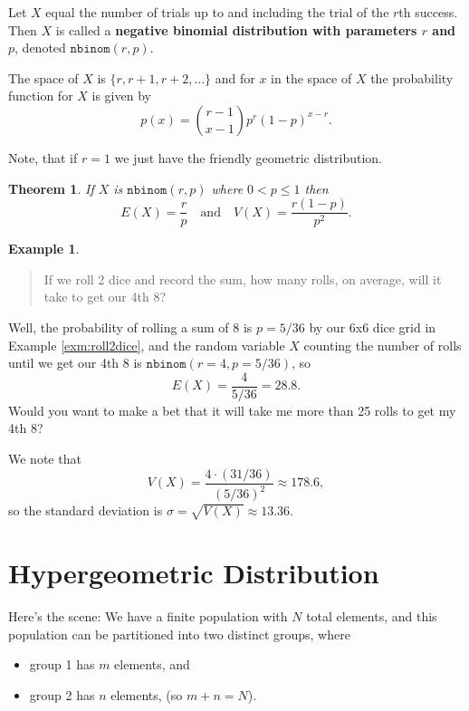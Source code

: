 \documentclass[
]{book}
\providecommand{\tightlist}{%
  \setlength{\itemsep}{0pt}\setlength{\parskip}{0pt}}
\newtheorem{theorem}{Theorem}[chapter]
\theoremstyle{definition}
\theoremstyle{definition}
\newtheorem{example}{Example}[chapter]
\theoremstyle{definition}
\theoremstyle{definition}
\theoremstyle{remark}
\begin{document}
Let \(X\) equal the number of trials up to and including the trial of the \(r\)th success. Then \(X\) is called a \textbf{negative binomial distribution with parameters \(r\) and \(p\)}, denoted \(\texttt{nbinom}(r,p)\).

The space of \(X\) is \(\{r, r+1, r+2, \ldots\}\) and for \(x\) in the space of \(X\) the probability function for \(X\) is given by \[p(x) = \binom{r-1}{x-1}p^r(1-p)^{x-r}.\]

Note, that if \(r=1\) we just have the friendly geometric distribution.

\begin{theorem}
\protect\hypertarget{thm:negative-binomial-EandV}{}\label{thm:negative-binomial-EandV}If \(X\) is \(\texttt{nbinom}(r,p)\) where \(0 < p \leq 1\) then
\[E(X) = \frac{r}{p} ~~~ \text{ and } ~~~ V(X) = \frac{r(1-p)}{p^2}.\]
\end{theorem}

\begin{example}
\leavevmode

\begin{quote}
If we roll 2 dice and record the sum, how many rolls, on average, will it take to get our 4th 8?
\end{quote}

Well, the probability of rolling a sum of 8 is \(p = 5/36\) by our 6x6 dice grid in Example \ref{exm:roll2dice}, and the random variable \(X\) counting the number of rolls until we get our 4th 8 is \(\texttt{nbinom}(r=4,p=5/36)\), so \[E(X) = \frac{4}{5/36} = 28.8.\] Would you want to make a bet that it will take me more than 25 rolls to get my 4th 8?

We note that \[V(X) = \frac{4\cdot (31/36)}{(5/36)^2} \approx 178.6,\] so the standard deviation is \(\sigma = \sqrt{V(X)} \approx 13.36\).

\end{example}

\section{Hypergeometric Distribution}\label{hypergometric}

Here's the scene: We have a finite population with \(N\) total elements, and this population can be partitioned into two distinct groups, where

\begin{itemize}
\tightlist
\item
  group 1 has \(m\) elements, and
\item
  group 2 has \(n\) elements, (so \(m + n = N\)).
\end{itemize}
\end{document}
